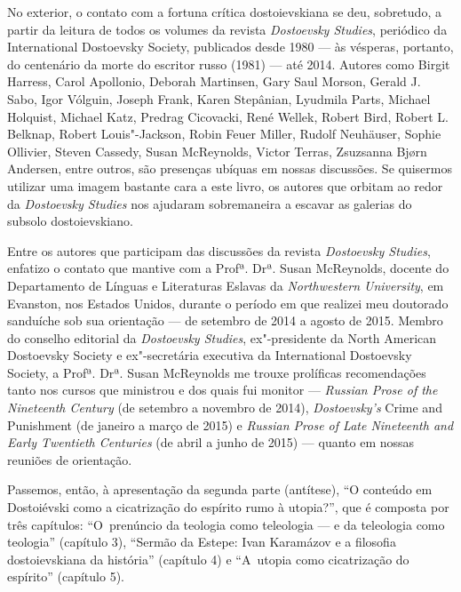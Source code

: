 No exterior, o contato com a fortuna crítica dostoievskiana se deu,
sobretudo, a partir da leitura de todos os volumes da revista
\emph{Dostoevsky Studies}, periódico da International Dostoevsky
Society, publicados desde 1980 --- às vésperas, portanto, do centenário
da morte do escritor russo (1981) --- até 2014. Autores como Birgit
Harress, Carol Apollonio, Deborah Martinsen, Gary Saul Morson, Gerald J.
Sabo, Igor Vólguin, Joseph Frank, Karen Stepânian, Lyudmila Parts,
Michael Holquist, Michael Katz, Predrag Cicovacki, René Wellek, Robert
Bird, Robert L. Belknap, Robert Louis"-Jackson, Robin Feuer Miller,
Rudolf Neuhäuser, Sophie Ollivier, Steven Cassedy, Susan McReynolds,
Victor Terras, Zsuzsanna Bjørn Andersen, entre outros, são presenças
ubíquas em nossas discussões. Se quisermos utilizar uma imagem bastante
cara a este livro, os autores que orbitam ao redor da \emph{Dostoevsky
Studies} nos ajudaram sobremaneira a escavar as galerias do subsolo
dostoievskiano.

Entre os autores que participam das discussões da revista
\emph{Dostoevsky Studies}, enfatizo o contato que mantive com a Profª.
Drª. Susan McReynolds, docente do Departamento de Línguas e Literaturas
Eslavas da \emph{Northwestern University}, em Evanston, nos Estados
Unidos, durante o período em que realizei meu doutorado sanduíche sob
sua orientação --- de setembro de 2014 a agosto de 2015. Membro do
conselho editorial da \emph{Dostoevsky Studies}, ex"-presidente da North
American Dostoevsky Society e ex"-secretária executiva da International
Dostoevsky Society, a Profª. Drª. Susan McReynolds me trouxe prolíficas
recomendações tanto nos cursos que ministrou e dos quais fui monitor ---
\emph{Russian Prose of the Nineteenth Century} (de setembro a novembro
de 2014), \emph{Dostoevsky's} Crime and Punishment (de janeiro a março
de 2015) e \emph{Russian Prose of Late Nineteenth and Early Twentieth
Centuries} (de abril a junho de 2015) --- quanto em nossas reuniões de
orientação.

Passemos, então, à apresentação da segunda parte (antítese), ``O
conteúdo em Dostoiévski como a cicatrização do espírito rumo à
utopia?'', que é composta por três capítulos: ``O~prenúncio da teologia
como teleologia --- e da teleologia como teologia'' (capítulo 3),
``Sermão da Estepe: Ivan Karamázov e a filosofia dostoievskiana da
história'' (capítulo 4) e ``A~utopia como cicatrização do espírito''
(capítulo 5).

